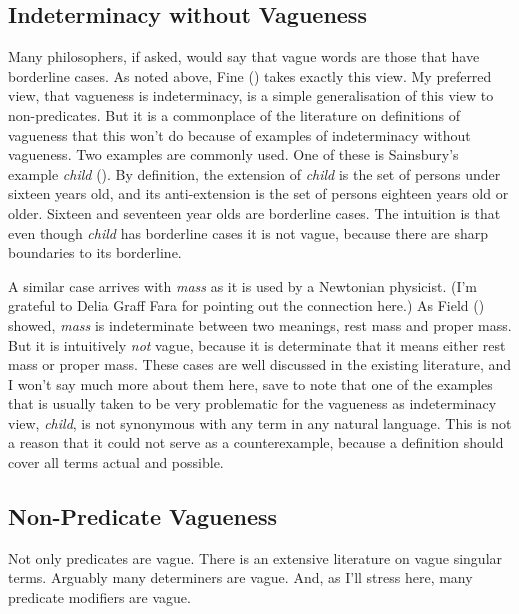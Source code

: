 \documentclass[
  10pt,
  letterpaper,
  DIV=11,
  numbers=noendperiod,
  twoside]{scrartcl}
\begin{document}
\subsection{Indeterminacy without
Vagueness}\label{indeterminacy-without-vagueness}

Many philosophers, if asked, would say that vague words are those that
have borderline cases. As noted above, Fine
() takes exactly this view. My preferred
view, that vagueness is indeterminacy, is a simple generalisation of
this view to non-predicates. But it is a commonplace of the literature
on definitions of vagueness that this won't do because of examples of
indeterminacy without vagueness. Two examples are commonly used. One of
these is Sainsbury's example \emph{child}
(). By definition, the
extension of \emph{child} is the set of persons under sixteen years old,
and its anti-extension is the set of persons eighteen years old or
older. Sixteen and seventeen year olds are borderline cases. The
intuition is that even though \emph{child} has borderline cases it is
not vague, because there are sharp boundaries to its borderline.

A similar case arrives with \emph{mass} as it is used by a Newtonian
physicist. (I'm grateful to Delia Graff Fara for pointing out the
connection here.) As Field () showed,
\emph{mass} is indeterminate between two meanings, rest mass and proper
mass. But it is intuitively \emph{not} vague, because it is determinate
that it means either rest mass or proper mass. These cases are well
discussed in the existing literature, and I won't say much more about
them here, save to note that one of the examples that is usually taken
to be very problematic for the vagueness as indeterminacy view,
\emph{child}, is not synonymous with any term in any natural language.
This is not a reason that it could not serve as a counterexample,
because a definition should cover all terms actual and possible.

\subsection{Non-Predicate Vagueness}\label{non-predicate-vagueness}

Not only predicates are vague. There is an extensive literature on vague
singular terms. Arguably many determiners are vague. And, as I'll stress
here, many predicate modifiers are vague.
\end{document}
